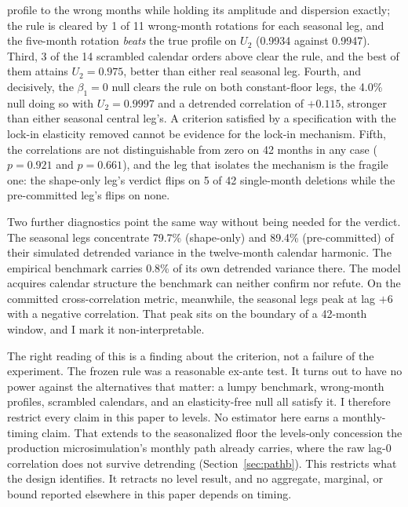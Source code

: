 \documentclass[12pt]{article}
\begin{document}
profile to the wrong months while holding its amplitude and dispersion exactly; the rule is cleared by 1 of 11 wrong-month rotations for each seasonal leg, and the five-month rotation \emph{beats} the true profile on $U_2$ (0.9934 against 0.9947). Third, 3 of the 14 scrambled calendar orders above clear the rule, and the best of them attains $U_2 = 0.975$, better than either real seasonal leg. Fourth, and decisively, the $\beta_1 = 0$ null clears the rule on both constant-floor legs, the 4.0\% null doing so with $U_2 = 0.9997$ and a detrended correlation of $+0.115$, stronger than either seasonal central leg's. A criterion satisfied by a specification with the lock-in elasticity removed cannot be evidence for the lock-in mechanism. Fifth, the correlations are not distinguishable from zero on 42 months in any case ($p = 0.921$ and $p = 0.661$), and the leg that isolates the mechanism is the fragile one: the shape-only leg's verdict flips on 5 of 42 single-month deletions while the pre-committed leg's flips on none.

Two further diagnostics point the same way without being needed for the verdict. The seasonal legs concentrate 79.7\% (shape-only) and 89.4\% (pre-committed) of their simulated detrended variance in the twelve-month calendar harmonic. The empirical benchmark carries 0.8\% of its own detrended variance there. The model acquires calendar structure the benchmark can neither confirm nor refute. On the committed cross-correlation metric, meanwhile, the seasonal legs peak at lag $+6$ with a negative correlation. That peak sits on the boundary of a 42-month window, and I mark it non-interpretable.

The right reading of this is a finding about the criterion, not a failure of the experiment. The frozen rule was a reasonable ex-ante test. It turns out to have no power against the alternatives that matter: a lumpy benchmark, wrong-month profiles, scrambled calendars, and an elasticity-free null all satisfy it. I therefore restrict every claim in this paper to levels. No estimator here earns a monthly-timing claim. That extends to the seasonalized floor the levels-only concession the production microsimulation's monthly path already carries, where the raw lag-0 correlation does not survive detrending (Section~\ref{sec:pathb}). This restricts what the design identifies. It retracts no level result, and no aggregate, marginal, or bound reported elsewhere in this paper depends on timing.
\end{document}

